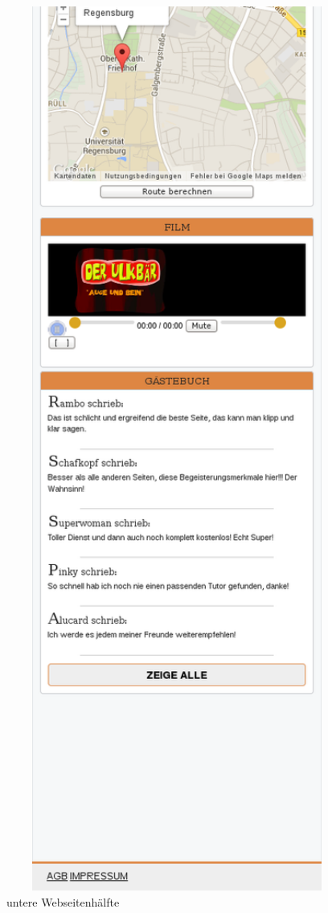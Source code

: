 \begin{figure}[!htbp]
 \centering
 \includegraphics[width=1\textwidth]{../Screenshots/responsive4002}
 \caption{untere Webseitenhälfte}
 \label{fig:responsive4002}
\end{figure}
